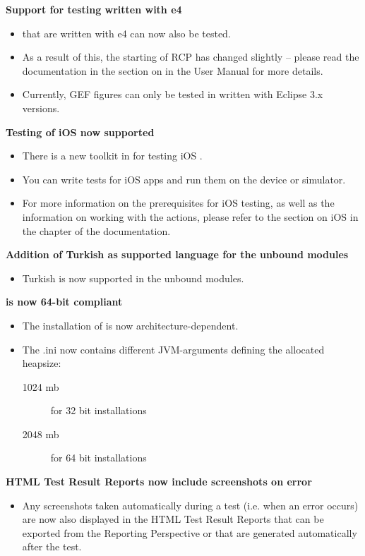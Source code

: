 \textbf{Support for testing \gdauts{} written with e4}
\begin{itemize}
\item \gdauts{} that are written with e4 can now also be tested.  
\item As a result of this, the starting of RCP \gdauts{} has changed slightly -- please read the documentation in the section on  in the User Manual for more details. 
\item Currently, GEF figures can only be tested in \gdauts{} written with Eclipse 3.x versions. 
\end{itemize}

\textbf{Testing of iOS \gdauts{} now supported}
\begin{itemize}
\item There is a new toolkit in \app{} for testing iOS \gdauts{}.
\item You can write tests for iOS apps and run them on the device or simulator.
\item For more information on the prerequisites for iOS testing, as well as the information on working with the actions, please refer to the section on iOS in the  chapter of the documentation. 
\end{itemize}


\textbf{Addition of Turkish as supported language for the unbound modules}
\begin{itemize}
\item Turkish is now supported in the unbound modules.
\end{itemize}

\textbf{\app{} is now 64-bit compliant}
\begin{itemize}
\item The installation of \app{} is now architecture-dependent.
\item The \app{}.ini now contains different JVM-arguments defining the allocated heapsize:
\begin{description}
\item [1024 mb]{for 32 bit installations}
\item [2048 mb]{for 64 bit installations}
\end{description}
\end{itemize}

\textbf{HTML Test Result Reports now include screenshots on error}
\begin{itemize}
\item Any screenshots taken automatically during a test (i.e. when an error occurs) are now also displayed in the HTML Test Result Reports that can be exported from the Reporting Perspective or that are generated automatically after the test. 
\end{itemize}

